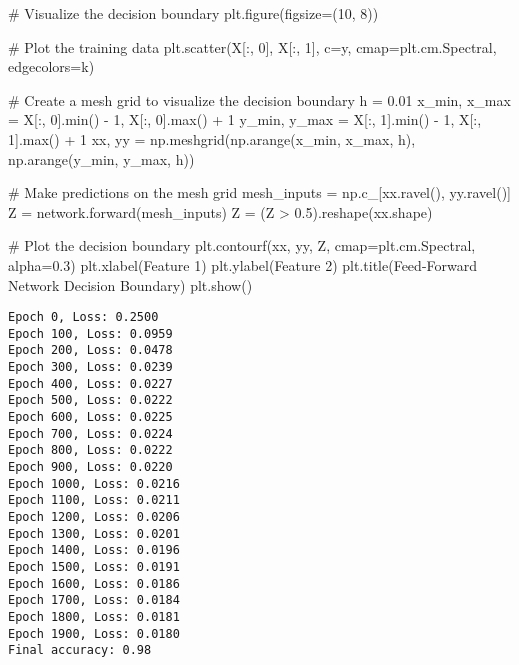 \documentclass[
  letterpaper,
  DIV=11,
  numbers=noendperiod]{scrreprt}
\newenvironment{Shaded}{\begin{snugshade}}{\end{snugshade}}
\newcommand{\BuiltInTok}[1]{\textcolor[rgb]{0.00,0.23,0.31}{#1}}
\newcommand{\CommentTok}[1]{\textcolor[rgb]{0.37,0.37,0.37}{#1}}
\newcommand{\DecValTok}[1]{\textcolor[rgb]{0.68,0.00,0.00}{#1}}
\newcommand{\FloatTok}[1]{\textcolor[rgb]{0.68,0.00,0.00}{#1}}
\newcommand{\NormalTok}[1]{\textcolor[rgb]{0.00,0.23,0.31}{#1}}
\newcommand{\OperatorTok}[1]{\textcolor[rgb]{0.37,0.37,0.37}{#1}}
\newcommand{\StringTok}[1]{\textcolor[rgb]{0.13,0.47,0.30}{#1}}
\begin{document}
\begin{Shaded}
\begin{Highlighting}[]
\CommentTok{\# Visualize the decision boundary}
\NormalTok{plt.figure(figsize}\OperatorTok{=}\NormalTok{(}\DecValTok{10}\NormalTok{, }\DecValTok{8}\NormalTok{))}

\CommentTok{\# Plot the training data}
\NormalTok{plt.scatter(X[:, }\DecValTok{0}\NormalTok{], X[:, }\DecValTok{1}\NormalTok{], c}\OperatorTok{=}\NormalTok{y, cmap}\OperatorTok{=}\NormalTok{plt.cm.Spectral, edgecolors}\OperatorTok{=}\StringTok{\textquotesingle{}k\textquotesingle{}}\NormalTok{)}

\CommentTok{\# Create a mesh grid to visualize the decision boundary}
\NormalTok{h }\OperatorTok{=} \FloatTok{0.01}
\NormalTok{x\_min, x\_max }\OperatorTok{=}\NormalTok{ X[:, }\DecValTok{0}\NormalTok{].}\BuiltInTok{min}\NormalTok{() }\OperatorTok{{-}} \DecValTok{1}\NormalTok{, X[:, }\DecValTok{0}\NormalTok{].}\BuiltInTok{max}\NormalTok{() }\OperatorTok{+} \DecValTok{1}
\NormalTok{y\_min, y\_max }\OperatorTok{=}\NormalTok{ X[:, }\DecValTok{1}\NormalTok{].}\BuiltInTok{min}\NormalTok{() }\OperatorTok{{-}} \DecValTok{1}\NormalTok{, X[:, }\DecValTok{1}\NormalTok{].}\BuiltInTok{max}\NormalTok{() }\OperatorTok{+} \DecValTok{1}
\NormalTok{xx, yy }\OperatorTok{=}\NormalTok{ np.meshgrid(np.arange(x\_min, x\_max, h),}
\NormalTok{                     np.arange(y\_min, y\_max, h))}

\CommentTok{\# Make predictions on the mesh grid}
\NormalTok{mesh\_inputs }\OperatorTok{=}\NormalTok{ np.c\_[xx.ravel(), yy.ravel()]}
\NormalTok{Z }\OperatorTok{=}\NormalTok{ network.forward(mesh\_inputs)}
\NormalTok{Z }\OperatorTok{=}\NormalTok{ (Z }\OperatorTok{\textgreater{}} \FloatTok{0.5}\NormalTok{).reshape(xx.shape)}

\CommentTok{\# Plot the decision boundary}
\NormalTok{plt.contourf(xx, yy, Z, cmap}\OperatorTok{=}\NormalTok{plt.cm.Spectral, alpha}\OperatorTok{=}\FloatTok{0.3}\NormalTok{)}
\NormalTok{plt.xlabel(}\StringTok{\textquotesingle{}Feature 1\textquotesingle{}}\NormalTok{)}
\NormalTok{plt.ylabel(}\StringTok{\textquotesingle{}Feature 2\textquotesingle{}}\NormalTok{)}
\NormalTok{plt.title(}\StringTok{\textquotesingle{}Feed{-}Forward Network Decision Boundary\textquotesingle{}}\NormalTok{)}
\NormalTok{plt.show()}
\end{Highlighting}
\end{Shaded}

\begin{verbatim}
Epoch 0, Loss: 0.2500
Epoch 100, Loss: 0.0959
Epoch 200, Loss: 0.0478
Epoch 300, Loss: 0.0239
Epoch 400, Loss: 0.0227
Epoch 500, Loss: 0.0222
Epoch 600, Loss: 0.0225
Epoch 700, Loss: 0.0224
Epoch 800, Loss: 0.0222
Epoch 900, Loss: 0.0220
Epoch 1000, Loss: 0.0216
Epoch 1100, Loss: 0.0211
Epoch 1200, Loss: 0.0206
Epoch 1300, Loss: 0.0201
Epoch 1400, Loss: 0.0196
Epoch 1500, Loss: 0.0191
Epoch 1600, Loss: 0.0186
Epoch 1700, Loss: 0.0184
Epoch 1800, Loss: 0.0181
Epoch 1900, Loss: 0.0180
Final accuracy: 0.98
\end{verbatim}
\end{document}
